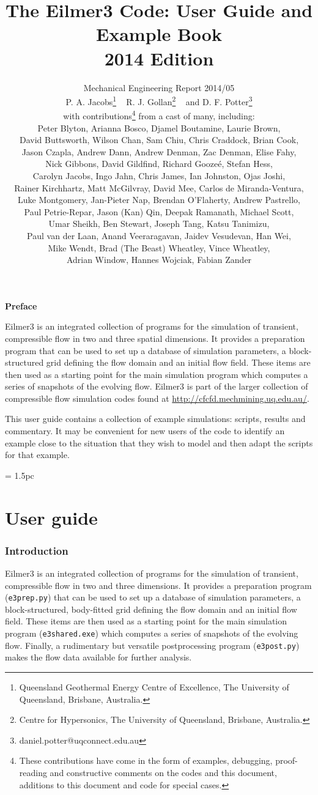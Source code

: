 \documentclass[12pt,a4paper,twoside]{article}
\title{
    The Eilmer3 Code: User Guide and Example Book\\
    2014 Edition
}
\author{
    Mechanical Engineering Report 2014/05\\
    P. A. Jacobs\thanks{Queensland Geothermal Energy Centre of Excellence, The University of Queensland, Brisbane, Australia.} 
    ~ R. J. Gollan\thanks{Centre for Hypersonics, The University of Queensland, Brisbane, Australia.}
    ~ and
    D. F. Potter\thanks{daniel.potter@uqconnect.edu.au}\\
    {\normalsize with contributions\thanks{These contributions have come in the form of examples, debugging, 
    proof-reading and constructive comments on the codes and this document, 
    additions to this document and code for special cases.}
    from a cast of many, including:}\\
    {\normalsize Peter Blyton,}
    {\normalsize Arianna Bosco,}
    {\normalsize Djamel Boutamine,}
    {\normalsize Laurie Brown,} \\
    {\normalsize David Buttsworth,}
    {\normalsize Wilson Chan,} 
    {\normalsize Sam Chiu,}
    {\normalsize Chris Craddock,} 
    {\normalsize Brian Cook,} \\ 
    {\normalsize Jason Czapla,}
    {\normalsize Andrew Dann,}  
    {\normalsize Andrew Denman,}
    {\normalsize Zac Denman,}
    {\normalsize Elise Fahy,} \\
    {\normalsize Nick Gibbons,} 
    {\normalsize David Gildfind,} 
    {\normalsize Richard Gooze\'{e},}
    {\normalsize Stefan Hess,} \\
    {\normalsize Carolyn Jacobs,} 
    {\normalsize Ingo Jahn,} 
    {\normalsize Chris James,}
    {\normalsize Ian Johnston,}
    {\normalsize Ojas Joshi,} \\
    {\normalsize Rainer Kirchhartz,} 
    {\normalsize Matt McGilvray,} 
    {\normalsize David Mee,} 
    {\normalsize Carlos de Miranda-Ventura,} \\
    {\normalsize Luke Montgomery,} 
    {\normalsize Jan-Pieter Nap,} 
    {\normalsize Brendan O'Flaherty,} 
    {\normalsize Andrew Pastrello,} \\
    {\normalsize Paul Petrie-Repar,} 
    {\normalsize Jason (Kan) Qin,} 
    {\normalsize Deepak Ramanath,} 
    {\normalsize Michael Scott,} \\
    {\normalsize Umar Sheikh,} 
    {\normalsize Ben Stewart,} 
    {\normalsize Joseph Tang,} 
    {\normalsize Katsu Tanimizu,} \\
    {\normalsize Paul van der Laan,} 
    {\normalsize Anand Veeraragavan,} 
    {\normalsize Jaidev Vesudevan,} 
    {\normalsize Han Wei,} \\
    {\normalsize Mike Wendt,} 
    {\normalsize Brad (The Beast) Wheatley,} 
    {\normalsize Vince Wheatley,} \\
    {\normalsize Adrian Window,} 
    {\normalsize Hannes Wojciak,}
    {\normalsize Fabian Zander}
}
\begin{document}
\maketitle

\centerline{\textbf{Preface}}
Eilmer3 is an integrated collection of programs for the simulation of transient,
compressible flow in two and three spatial dimensions.
It provides a preparation program that can be used to set up a database of
simulation parameters, a block-structured grid defining the flow domain and an
initial flow field.
These items are then used as a starting point for the main simulation program
which computes a series of snapshots of the evolving flow.
Eilmer3 is part of the larger collection of compressible flow simulation codes
found at \url{http://cfcfd.mechmining.uq.edu.au/}.

\medskip
This user guide contains a collection of example simulations: scripts, results
and commentary.
It may be convenient for new users of the code to identify an example
close to the situation that they wish to model and then adapt the 
scripts for that example.

\cleardoublepage
\tableofcontents

\cleardoublepage
\baselineskip = 1.5pc

\part{User guide}

\section{Introduction}
%
Eilmer3 is an integrated collection of programs for the simulation of transient,
compressible flow in two and three dimensions.
It provides a preparation program (\texttt{e3prep.py}) that can be used to set up a database of
simulation parameters, a block-structured, body-fitted grid defining the flow domain and an
initial flow field.
These items are then used as a starting point for the main simulation program (\texttt{e3shared.exe})
which computes a series of snapshots of the evolving flow.
Finally, a rudimentary but versatile postprocessing program (\texttt{e3post.py}) makes the flow data
available for further analysis.
\end{document}
